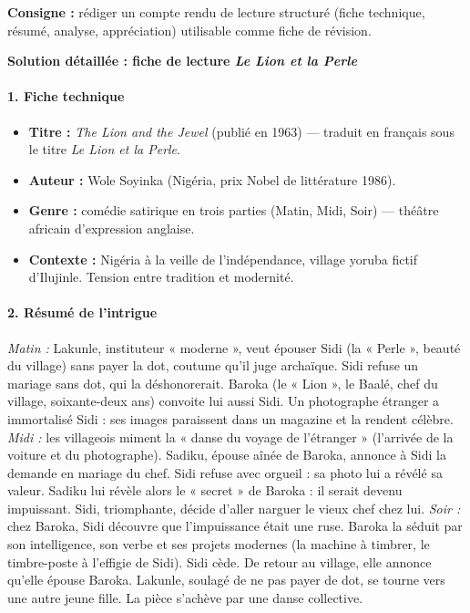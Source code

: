 \documentclass[11pt]{article}
\begin{document}
\begin{exoresolu}
\textbf{Consigne :} rédiger un compte rendu de lecture structuré (fiche technique, résumé, analyse, appréciation) utilisable comme fiche de révision.

\tcblower
\textbf{Solution détaillée : fiche de lecture \emph{Le Lion et la Perle}}

\paragraph{1. Fiche technique}
\begin{itemize}
    \item \textbf{Titre :} \emph{The Lion and the Jewel} (publié en 1963) — traduit en français sous le titre \emph{Le Lion et la Perle}.
    \item \textbf{Auteur :} Wole Soyinka (Nigéria, prix Nobel de littérature 1986).
    \item \textbf{Genre :} comédie satirique en trois parties (Matin, Midi, Soir) — théâtre africain d'expression anglaise.
    \item \textbf{Contexte :} Nigéria à la veille de l'indépendance, village yoruba fictif d'Ilujinle. Tension entre tradition et modernité.
\end{itemize}

\paragraph{2. Résumé de l'intrigue}
\emph{Matin :} Lakunle, instituteur « moderne », veut épouser Sidi (la « Perle », beauté du village) sans payer la dot, coutume qu'il juge archaïque. Sidi refuse un mariage sans dot, qui la déshonorerait. Baroka (le « Lion », le Baalé, chef du village, soixante-deux ans) convoite lui aussi Sidi. Un photographe étranger a immortalisé Sidi : ses images paraissent dans un magazine et la rendent célèbre.
\emph{Midi :} les villageois miment la « danse du voyage de l'étranger » (l'arrivée de la voiture et du photographe). Sadiku, épouse aînée de Baroka, annonce à Sidi la demande en mariage du chef. Sidi refuse avec orgueil : sa photo lui a révélé sa valeur. Sadiku lui révèle alors le « secret » de Baroka : il serait devenu impuissant. Sidi, triomphante, décide d'aller narguer le vieux chef chez lui.
\emph{Soir :} chez Baroka, Sidi découvre que l'impuissance était une ruse. Baroka la séduit par son intelligence, son verbe et ses projets modernes (la machine à timbrer, le timbre-poste à l'effigie de Sidi). Sidi cède. De retour au village, elle annonce qu'elle épouse Baroka. Lakunle, soulagé de ne pas payer de dot, se tourne vers une autre jeune fille. La pièce s'achève par une danse collective.


\end{exoresolu}
\end{document}
